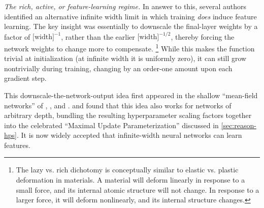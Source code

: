 \textit{The rich, active, or feature-learning regime.}
In answer to this, several authors identified an alternative infinite width limit in which training \textit{does} induce feature learning.
The key insight was essentially to downscale the final-layer weights by a factor of $\text{[width]}^{-1}$, rather than the earlier $\text{[width]}^{-1/2}$, thereby forcing the network weights to change more to compensate.%
\footnote{The lazy vs. rich dichotomy is conceptually similar to elastic vs. plastic deformation in materials. A material will deform linearly in response to a small force, and its internal atomic structure will not change. In response to a larger force, it will deform nonlinearly, and its internal structure changes.}
While this makes the function trivial at initialization (at infinite width it is uniformly zero), it can still grow nontrivially during training, changing by an order-one amount upon each gradient step.

This downscale-the-network-output idea first appeared in the shallow ``mean-field networks'' of \citet{mei2019mean}, \citet{rotskoff2018parameters}, and \citet{chizat2018global}.
\citet{geiger2020disentangling} and \citet{yang2021tensor} found that this idea also works for networks of arbitrary depth, bundling the resulting hyperparameter scaling factors together into the celebrated ``Maximal Update Parameterization'' discussed in \cref{sec:reason-hps}.
It is now widely accepted that infinite-width neural networks can learn features.

